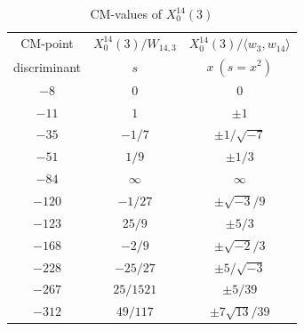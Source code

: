 \documentclass{amsart}
\theoremstyle{definition}
\begin{document}
\begin{appendices}
\renewcommand{\arraystretch}{1.5}
\tabcolsep=10pt                         
\begin{table}
\begin{tabular}{|c|c|c|}
\hline
CM-point& $X_{0}^{14}\left( 3\right) /W_{14,3}$ & $X_{0}^{14}\left( 3\right)/\langle w_3,w_{14}\rangle $ \\ 

 discriminant & $s$ & $ x\ (s=x^2)$ \\ \hline
${-8}$ & $0$ & $0 $ \\ 
${-11}$ & $1$ & $\pm 1$ \\ 
${-35}$ & $-{1}/{7}$ & $\pm{1/ \sqrt{-7}}$ \\ 
${-51}$ & ${1}/{9}$ & $\pm {1}/{3}$ \\
${-84}$ & $\infty $ & $\infty$ \\ 
${-120}$ & $-{1}/{27}$ & $\pm {\sqrt{-3}}/{9}$ \\ 
${-123}$ & ${25}/{9}$ & $\pm{ 5}/{3}$ \\
${-168}$ & $-{2}/{9}$ & $\pm{\sqrt{-2}}/{3}$ \\
${-228}$ & $-{25}/{27}$ & $\pm{ 5/\sqrt{-3}}$ \\ 
${-267}$ & ${25}/{1521}$ & $\pm{ 5}/{39}$ \\ 
${-312}$ & ${49}/{117}$ & $\pm{ 7\sqrt{13}}/{39}$ \\ \hline
\end{tabular}
\bigskip
\caption{CM-values of $X^{14}_0(3)$}





\end{table}
\end{appendices}
\end{document}
